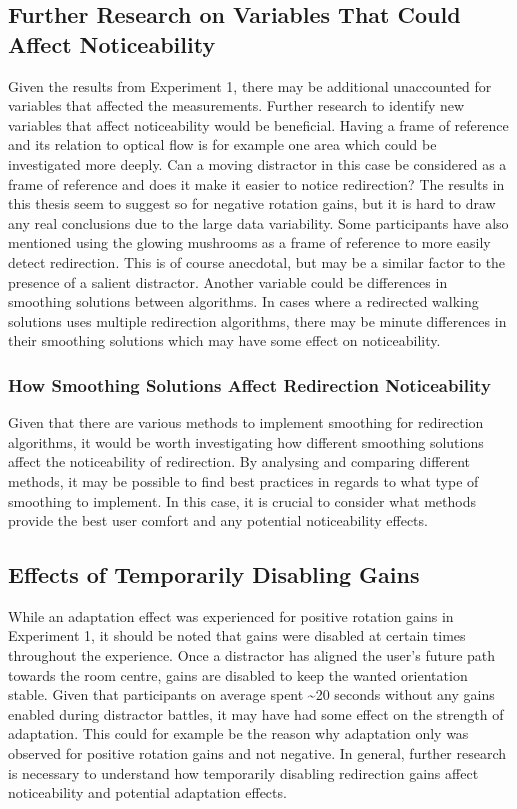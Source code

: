 \subsection{Further Research on Variables That Could Affect Noticeability}
Given the results from Experiment 1, there may be additional unaccounted for variables that affected the measurements. Further research to identify new variables that affect noticeability would be beneficial. Having a frame of reference and its relation to optical flow is for example one area which could be investigated more deeply. Can a moving distractor in this case be considered as a frame of reference and does it make it easier to notice redirection? The results in this thesis seem to suggest so for negative rotation gains, but it is hard to draw any real conclusions due to the large data variability. Some participants have also mentioned using the glowing mushrooms as a frame of reference to more easily detect redirection. This is of course anecdotal, but may be a similar factor to the presence of a salient distractor. Another variable could be differences in smoothing solutions between algorithms. In cases where a redirected walking solutions uses multiple redirection algorithms, there may be minute differences in their smoothing solutions which may have some effect on noticeability. 

\subsubsection{How Smoothing Solutions Affect Redirection Noticeability} 
Given that there are various methods to implement smoothing for redirection algorithms, it would be worth investigating how different smoothing solutions affect the noticeability of redirection. By analysing and comparing different methods, it may be possible to find best practices in regards to what type of smoothing to implement. In this case, it is crucial to consider what methods provide the best user comfort and any potential noticeability effects. 

\subsection{Effects of Temporarily Disabling Gains}
While an adaptation effect was experienced for positive rotation gains in Experiment 1, it should be noted that gains were disabled at certain times throughout the experience. Once a distractor has aligned the user's future path towards the room centre, gains are disabled to keep the wanted orientation stable. Given that participants on average spent \textasciitilde20 seconds without any gains enabled during distractor battles, it may have had some effect on the strength of adaptation. This could for example be the reason why adaptation only was observed for positive rotation gains and not negative. In general, further research is necessary to understand how temporarily disabling redirection gains affect noticeability and potential adaptation effects.

